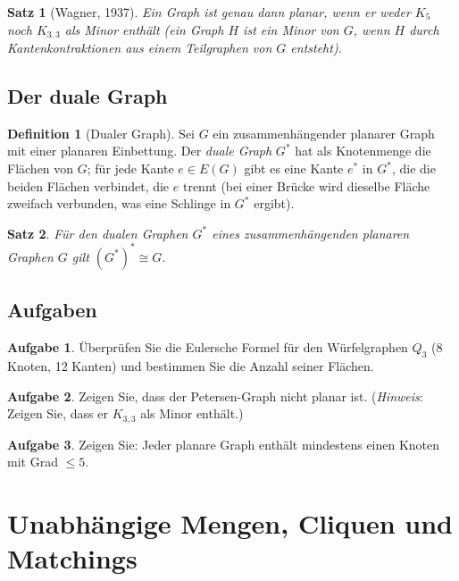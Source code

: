 ﻿\documentclass[a4paper,12pt,openany,oneside]{book}
\theoremstyle{definition}
\newtheorem{definition}{Definition}[chapter]
\newtheorem{aufgabe}{Aufgabe}[chapter]
\theoremstyle{plain}
\newtheorem{satz}{Satz}[chapter]
\theoremstyle{remark}
\begin{document}
\begin{satz}[Wagner, 1937]
  Ein Graph ist genau dann planar, wenn er weder $K_5$ noch $K_{3,3}$ als
  Minor enth\"alt (ein Graph $H$ ist ein \emph{Minor} von $G$, wenn $H$ durch
  Kantenkontraktionen aus einem Teilgraphen von $G$ entsteht).
\end{satz}

\section{Der duale Graph}

\begin{definition}[Dualer Graph]
  Sei $G$ ein zusammenh\"angender planarer Graph mit einer planaren Einbettung.
  Der \emph{duale Graph} $G^*$ hat als Knotenmenge die Fl\"achen von $G$;
  f\"ur jede Kante $e \in E(G)$ gibt es eine Kante $e^*$ in $G^*$, die die
  beiden Fl\"achen verbindet, die $e$ trennt (bei einer Br\"ucke wird
  dieselbe Fl\"ache zweifach verbunden, was eine Schlinge in $G^*$ ergibt).
\end{definition}

\begin{satz}
  F\"ur den dualen Graphen $G^*$ eines zusammenh\"angenden planaren Graphen
  $G$ gilt $(G^*)^* \cong G$.
\end{satz}

\section{Aufgaben}

\begin{aufgabe}
  \"Uberpr\"ufen Sie die Eulersche Formel f\"ur den W\"urfelgraphen $Q_3$
  (8 Knoten, 12 Kanten) und bestimmen Sie die Anzahl seiner Fl\"achen.
\end{aufgabe}

\begin{aufgabe}
  Zeigen Sie, dass der Petersen-Graph nicht planar ist.
  (\emph{Hinweis}: Zeigen Sie, dass er $K_{3,3}$ als Minor enth\"alt.)
\end{aufgabe}

\begin{aufgabe}
  Zeigen Sie: Jeder planare Graph enth\"alt mindestens einen Knoten mit
  Grad $\leq 5$.
\end{aufgabe}

\chapter{Unabh\"angige Mengen, Cliquen und Matchings}
\end{document}
